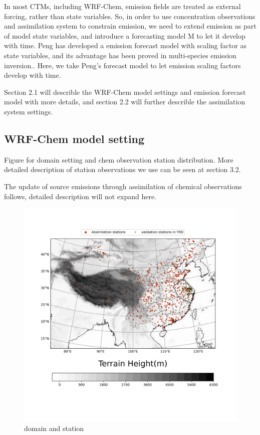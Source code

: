 \documentclass{ametsocV6.1}
\begin{document}
In most CTMs, including WRF-Chem, emission fields are treated as external forcing, rather than state variables. So, in order to use concentration observations and assimilation system to constrain emission, we need to extend emission as part of model state variables, and introduce a forecasting model M to let it develop with time. Peng has developed a emission forecast model with scaling factor as state variables, and its advantage has been proved in multi-species emission inversion.\citep{Peng_2017, Peng_2018}. Here, we take Peng's forecast model to let emission scaling factors develop with time.

Section 2.1 will describle the WRF-Chem model settings and emission forecast model with more details, and section 2.2 will further describle the assimilation system settings.

\subsection{WRF-Chem model setting}


Figure for domain setting and chem observation station distribution. More detailed description of station observations we use can be seen at section 3.2.

The update of source emissions through assimilation of chemical observations follows\citep{Peng_2017}, detailed description will not expand here.

\begin{figure}
    \centerline{\includegraphics[width=30pc,angle=0]{figure/domain_station_yrd_withvalid.png}}
    \caption{domain and station}\label{fig1}
\end{figure}
\end{document}
